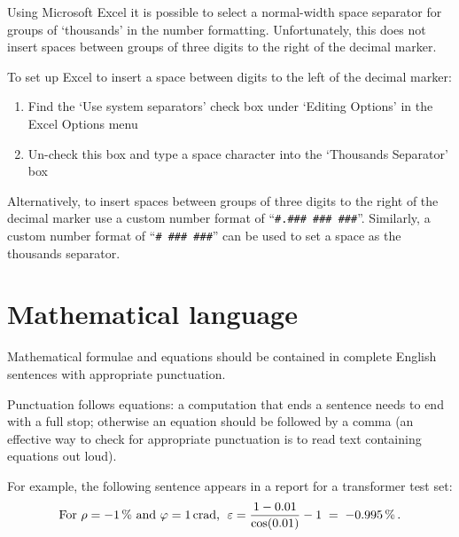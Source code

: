 Using Microsoft Excel it is possible to select a normal-width space separator for groups of `thousands'  in the number formatting. Unfortunately, this does not insert spaces between groups of three digits to the right of the decimal marker. 

To set up Excel to insert a space between digits to the left of the decimal marker:
\begin{enumerate}
\item Find the `Use system separators' check box under `Editing Options' in the Excel Options menu 
\item Un-check this box and type a space character into the `Thousands Separator' box
\end{enumerate} 

Alternatively, to insert spaces between groups of three digits to the right of the decimal marker use a custom number format of ``\verb|#.### ### ###|''. Similarly, a custom number format of ``\verb|# ### ###|'' can be used to set a space as the thousands separator.

\section{Mathematical language}
Mathematical formulae and equations should be contained in complete English sentences with appropriate punctuation. 

Punctuation follows equations: a computation that ends a sentence needs to end with a full stop; otherwise an equation should be followed by a comma (an effective way to check for appropriate punctuation is to read text containing equations out loud). 

For example, the following sentence appears in a report for a transformer test set: 
\[
\text{For $\rho = \SI{-1}{\%}$ and $\varphi= \SI{1}{crad}$,\; }
\varepsilon = \frac{1-0.01}{\cos(0.01)} - 1 \; =\; \SI{-0.995}{\%}\,. 
\]

